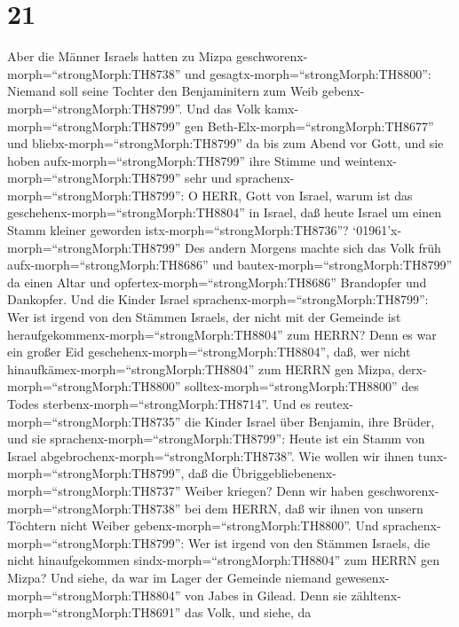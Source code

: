 \hypertarget{section-20}{%
\section{21}\label{section-20}}

 Aber die Männer Israels hatten zu Mizpa
geschworenx-morph=``strongMorph:TH8738'' und
gesagtx-morph=``strongMorph:TH8800'': Niemand soll seine Tochter den
Benjaminitern zum Weib gebenx-morph=``strongMorph:TH8799''. 
Und das Volk kamx-morph=``strongMorph:TH8799'' gen
Beth-Elx-morph=``strongMorph:TH8677'' und
bliebx-morph=``strongMorph:TH8799'' da bis zum Abend vor Gott, und sie
hoben aufx-morph=``strongMorph:TH8799'' ihre Stimme und
weintenx-morph=``strongMorph:TH8799'' sehr  und
sprachenx-morph=``strongMorph:TH8799'': O HERR, Gott von Israel, warum
ist das geschehenx-morph=``strongMorph:TH8804'' in Israel, daß heute
Israel um einen Stamm kleiner geworden
istx-morph=``strongMorph:TH8736''? 
`01961'\textbar x-morph=``strongMorph:TH8799'' Des andern Morgens machte
sich das Volk früh aufx-morph=``strongMorph:TH8686'' und
bautex-morph=``strongMorph:TH8799'' da einen Altar und
opfertex-morph=``strongMorph:TH8686'' Brandopfer und Dankopfer.
 Und die Kinder Israel
sprachenx-morph=``strongMorph:TH8799'': Wer ist irgend von den Stämmen
Israels, der nicht mit der Gemeinde ist
heraufgekommenx-morph=``strongMorph:TH8804'' zum HERRN? Denn es war ein
großer Eid geschehenx-morph=``strongMorph:TH8804'', daß, wer nicht
hinaufkämex-morph=``strongMorph:TH8804'' zum HERRN gen Mizpa,
derx-morph=``strongMorph:TH8800'' solltex-morph=``strongMorph:TH8800''
des Todes sterbenx-morph=``strongMorph:TH8714''.  Und es
reutex-morph=``strongMorph:TH8735'' die Kinder Israel über Benjamin,
ihre Brüder, und sie sprachenx-morph=``strongMorph:TH8799'': Heute ist
ein Stamm von Israel abgebrochenx-morph=``strongMorph:TH8738''.
 Wie wollen wir ihnen tunx-morph=``strongMorph:TH8799'', daß
die Übriggebliebenenx-morph=``strongMorph:TH8737'' Weiber kriegen? Denn
wir haben geschworenx-morph=``strongMorph:TH8738'' bei dem HERRN, daß
wir ihnen von unsern Töchtern nicht Weiber
gebenx-morph=``strongMorph:TH8800''.  Und
sprachenx-morph=``strongMorph:TH8799'': Wer ist irgend von den Stämmen
Israels, die nicht hinaufgekommen sindx-morph=``strongMorph:TH8804'' zum
HERRN gen Mizpa? Und siehe, da war im Lager der Gemeinde niemand
gewesenx-morph=``strongMorph:TH8804'' von Jabes in Gilead. 
Denn sie zähltenx-morph=``strongMorph:TH8691'' das Volk, und siehe, da
